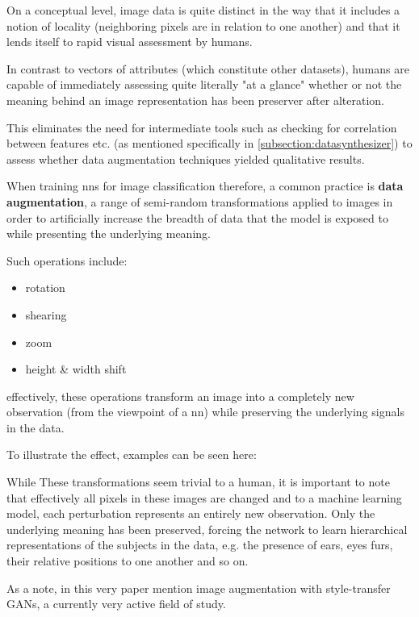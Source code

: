 On a conceptual level, image data is quite distinct in the way that it includes a notion of locality (neighboring pixels are in relation to one another) and that it lends itself to rapid visual assessment by humans. 

In contrast to vectors of attributes (which constitute other datasets), humans are capable of immediately assessing quite literally "at a glance" whether or not the meaning behind an image representation has been preserver after alteration. 

This eliminates the need for intermediate tools such as checking for correlation between features etc. (as mentioned specifically in \ref{subsection:datasynthesizer}) to assess whether data augmentation techniques yielded qualitative results.

When training \acp{nn} for image classification therefore, a common practice is \textbf{data augmentation}, a range of semi-random transformations applied to images in order to artificially increase the breadth of data that the model is exposed to while presenting the underlying meaning. 

\pagebreak

Such operations include:
\begin{itemize}
	\item rotation
	\item shearing
	\item zoom
	\item height \& width shift
\end{itemize}

effectively, these operations transform an image into a completely new observation (from the viewpoint of a \ac{nn}) while preserving the underlying signals in the data. 

To illustrate the effect, examples can be seen here:


While These transformations seem trivial to a human, it is important to note that effectively all pixels in these images are changed and to a machine learning model, each perturbation represents an entirely new observation. 
Only the underlying meaning has been preserved, forcing the network to learn hierarchical representations of the subjects in the data, e.g. the presence of ears, eyes furs, their relative positions to one another and so on. 

As a note, in this very paper \cite{perez2017effectiveness} mention image augmentation with style-transfer \acp{GAN}, a currently very active field of study.

